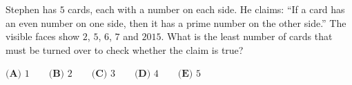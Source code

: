 Stephen has $5$ cards, each with a number on each side. He claims: ``If a card has an even number on one side, then it has a prime number on the other side.'' The visible faces show $2$, $5$, $6$, $7$ and $2015$. What is the least number of cards that must be turned over to check whether the claim is true?

$\textbf{(A) }1\qquad\textbf{(B) }2\qquad\textbf{(C) }3\qquad\textbf{(D) }4\qquad\textbf{(E) }5$
